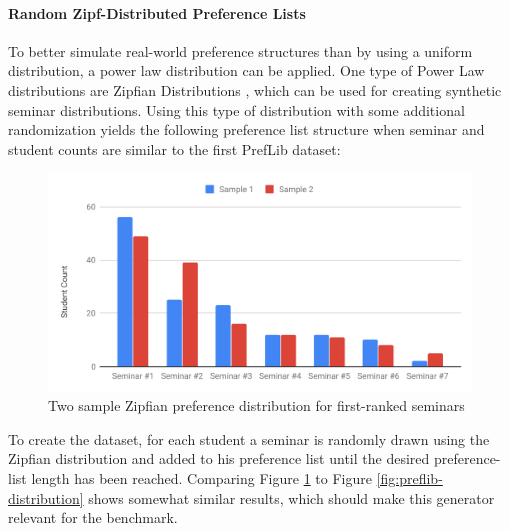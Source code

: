 \paragraph{Random Zipf-Distributed Preference Lists}
To better simulate real-world preference structures than by using a uniform distribution, a power law distribution can be applied. One type of Power Law distributions are Zipfian Distributions \cite{Zipf}, which can be used for creating synthetic seminar distributions. Using this type of distribution with some additional randomization yields the following preference list structure when seminar and student counts are similar to the first PrefLib dataset:

  \begin{figure}[h!]
    \centering
    \includegraphics[width=0.8\linewidth]{assets/plots/zipfian-distr.pdf}
    \caption{Two sample Zipfian preference distribution for first-ranked seminars}
    \label{fig:zipfian-distribution}
\end{figure}

To create the dataset, for each student a seminar is randomly drawn using the Zipfian distribution and added to his preference list until the desired preference-list length has been reached. Comparing Figure \ref{fig:zipfian-distribution} to Figure \ref{fig:preflib-distribution} shows somewhat similar results, which should make this generator relevant for the benchmark. 

